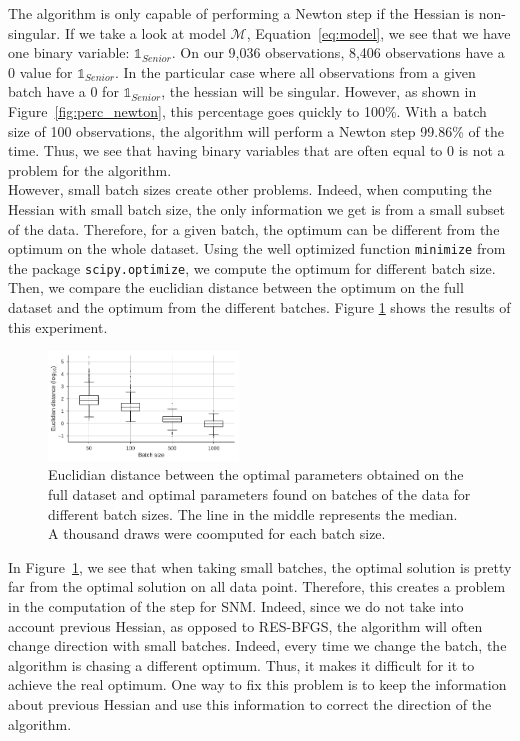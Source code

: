 \documentclass[conference]{IEEEtran}
\begin{document}
The algorithm is only capable of performing a Newton step if the Hessian is non-singular. If we take a look at model $\mathcal{M}$, Equation~\ref{eq:model}, we see that we have one binary variable: $\mathbb{1}_{Senior}$. On our 9,036 observations, 8,406 observations have a 0 value for $\mathbb{1}_{Senior}$. In the particular case where all observations from a given batch have a 0 for $\mathbb{1}_{Senior}$, the hessian will be singular. However, as shown in Figure~\ref{fig:perc_newton}, this percentage goes quickly to 100\%. With a batch size of 100 observations, the algorithm will perform a Newton step 99.86\% of the time. Thus, we see that having binary variables that are often equal to 0 is not a problem for the algorithm. \\

However, small batch sizes create other problems. Indeed, when computing the Hessian with small batch size, the only information we get is from a small subset of the data. Therefore, for a given batch, the optimum can be different from the optimum on the whole dataset. Using the well optimized function \texttt{minimize} from the package \texttt{scipy.optimize}, we compute the optimum for different batch size. Then, we compare the euclidian distance between the optimum on the full dataset and the optimum from the different batches. Figure \ref{fig:batch_dist} shows the results of this experiment.

\begin{figure}[t]
\centering
\includegraphics[width=0.45\textwidth]{../figures/dist.pdf}
\vspace{-0.3cm}
\caption{Euclidian distance between the optimal parameters obtained on the full dataset and optimal parameters found on batches of the data for different batch sizes. The line in the middle represents the median. A thousand draws were coomputed for each batch size.}
\label{fig:batch_dist}
\vspace{-0.5cm}
\end{figure}

In Figure~\ref{fig:batch_dist}, we see that when taking small batches, the optimal solution is pretty far from the optimal solution on all data point. Therefore, this creates a problem in the computation of the step for SNM. Indeed, since we do not take into account previous Hessian, as opposed to RES-BFGS, the algorithm will often change direction with small batches. Indeed, every time we change the batch, the algorithm is chasing a different optimum. Thus, it makes it difficult for it to achieve the real optimum. One way to fix this problem is to keep the information about previous Hessian and use this information to correct the direction of the algorithm.
\end{document}
